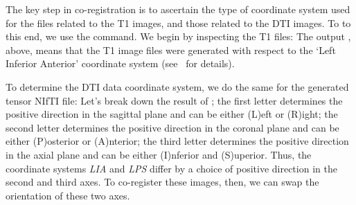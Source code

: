 The key step in co-registration is to ascertain the type of coordinate system used 
for the files related to the T1 images, and those related to the DTI images. To 
to this end, we use the  command. We begin by inspecting the T1 files:
\noindent The output , above, means that the T1 image files
were generated with respect to the `Left Inferior Anterior' coordinate
system (see~\cite{freesurfer-wiki} for details).

To determine the DTI data coordinate system, we do the same for the
generated tensor NIfTI file:
Let's break down the result of ; the first letter determines the 
positive direction in the sagittal plane and can be either (L)eft or (R)ight; 
the second letter determines the positive direction in the coronal plane and 
can be either (P)osterior or (A)nterior; the third letter determines the positive 
direction in the axial plane and can be either (I)nferior and (S)uperior. 
Thus, the coordinate systems \emph{LIA} and \emph{LPS} differ by a choice of 
positive direction in the second and third axes. To co-register these images, 
then, we can swap the orientation of these two axes.

